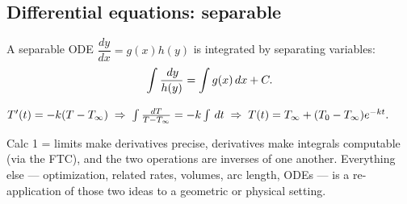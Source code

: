 \subsection{Differential equations: separable}
A separable ODE $\dfrac{dy}{dx} = g(x) h(y)$ is integrated by separating variables:
\[ \int \frac{\,dy}{h(y)} = \int g(x) \,dx + C. \]

\begin{example}
$T'(t) = -k(T - T_\infty) \;\Rightarrow\; \int \frac{dT}{T - T_\infty} = -k \int \,dt
\;\Rightarrow\; T(t) = T_\infty + (T_0 - T_\infty) e^{-kt}.$
\end{example}

\begin{keybox}
Calc 1 = limits make derivatives precise, derivatives make integrals computable (via the FTC),
and the two operations are inverses of one another. Everything else --- optimization, related rates,
volumes, arc length, ODEs --- is a re-application of those two ideas to a geometric or physical setting.
\end{keybox}
